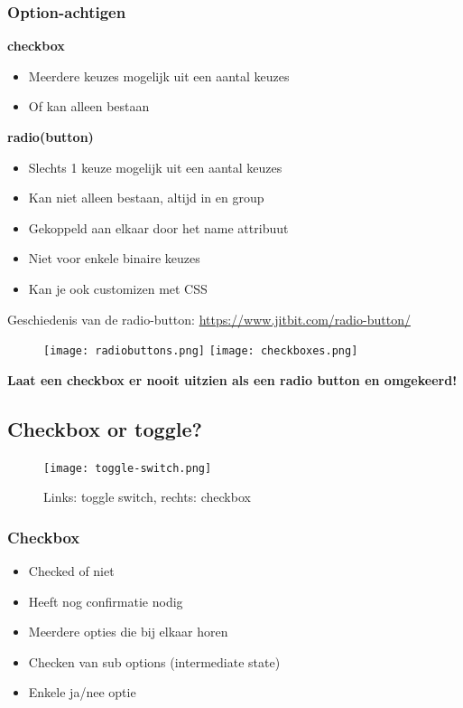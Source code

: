 \documentclass{article}
\newcommand{\bold}[1]{\textbf{#1}}
\begin{document}
\subsubsection{Option-achtigen}

\bold{checkbox}

\begin{itemize}
    \item Meerdere keuzes mogelijk uit een aantal keuzes
    \item Of kan alleen bestaan
\end{itemize}

\bold{radio(button)}

\begin{itemize}
    \item Slechts 1 keuze mogelijk uit een aantal keuzes
    \item Kan niet alleen bestaan, altijd in en group
    \item Gekoppeld aan elkaar door het name attribuut
    \item Niet voor enkele binaire keuzes
    \item Kan je ook customizen met CSS
\end{itemize}

Geschiedenis van de radio-button: \url{https://www.jitbit.com/radio-button/}

\begin{figure}[H]
    \centering
    \texttt{[image: radiobuttons.png]}
    \texttt{[image: checkboxes.png]}
    \caption{}
\end{figure}

\bold{Laat een checkbox er nooit uitzien als een radio button en omgekeerd!}

\subsection{Checkbox or toggle?}
\begin{figure}[H]
    \centering
    \texttt{[image: toggle-switch.png]}
    \caption{Links: toggle switch, rechts: checkbox}
\end{figure}

\subsubsection{Checkbox}
\begin{itemize}
    \item Checked of niet
    \item Heeft nog confirmatie nodig
    \item Meerdere opties die bij elkaar horen
    \item Checken van sub options (intermediate state)
    \item Enkele ja/nee optie
\end{itemize}
\end{document}

